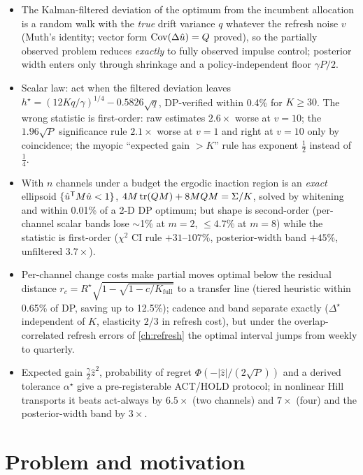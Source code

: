 \begin{keyideas}
\begin{itemize}
\item The Kalman-filtered deviation of the optimum from the incumbent allocation is a random walk with the \emph{true} drift variance $q$ whatever the refresh noise $v$ (Muth's identity; vector form $\operatorname{Cov}(\Delta\hat u) = Q$ proved), so the partially observed problem reduces \emph{exactly} to fully observed impulse control; posterior width enters only through shrinkage and a policy-independent floor $\gamma P/2$.
\item Scalar law: act when the filtered deviation leaves $h^\star = (12Kq/\gamma)^{1/4} - 0.5826\sqrt q$, DP-verified within 0.4\% for $K \ge 30$. The wrong statistic is first-order: raw estimates $2.6\times$ worse at $v = 10$; the $1.96\sqrt P$ significance rule $2.1\times$ worse at $v = 1$ and right at $v = 10$ only by coincidence; the myopic ``expected gain $> K$'' rule has exponent $\tfrac12$ instead of $\tfrac14$.
\item With $n$ channels under a budget the ergodic inaction region is an \emph{exact} ellipsoid $\{\hat u^{\mathsf{T}} M\hat u < 1\}$, $4M\operatorname{tr}(QM) + 8MQM = \Sigma/K$, solved by whitening and within 0.01\% of a 2-D DP optimum; but shape is second-order (per-channel scalar bands lose $\sim$1\% at $m = 2$, $\le 4.7\%$ at $m = 8$) while the statistic is first-order ($\chi^2$ CI rule $+31$--$107\%$, posterior-width band $+45\%$, unfiltered $3.7\times$).
\item Per-channel change costs make partial moves optimal below the residual distance $r_c = R^\star\sqrt{1 - \sqrt{1 - c/K_{\mathrm{full}}}}$ to a transfer line (tiered heuristic within 0.65\% of DP, saving up to 12.5\%); cadence and band separate exactly ($\Delta^\star$ independent of $K$, elasticity $2/3$ in refresh cost), but under the overlap-correlated refresh errors of \cref{ch:refresh} the optimal interval jumps from weekly to quarterly.
\item Expected gain $\tfrac{\gamma}{2}\hat z^2$, probability of regret $\Phi(-|\hat z|/(2\sqrt P))$ and a derived tolerance $\alpha^\star$ give a pre-registerable ACT/HOLD protocol; in nonlinear Hill transports it beats act-always by $6.5\times$ (two channels) and $7\times$ (four) and the posterior-width band by $3\times$.
\end{itemize}
\end{keyideas}

\section{Problem and motivation}

